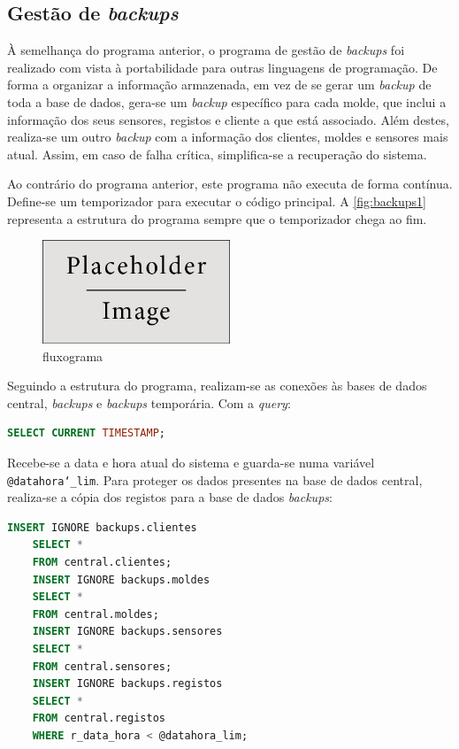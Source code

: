 \documentclass[11pt,twoside,a4paper]{report}
\begin{document}
\subsection{Gestão de \textit{backups}}
\label{subchap:backups}
À semelhança do programa anterior, o programa de gestão de \textit{backups} foi realizado com vista à portabilidade para outras linguagens de programação. De forma a organizar a informação armazenada, em vez de se gerar um \textit{backup} de toda a base de dados, gera-se um \textit{backup} específico para cada molde, que inclui a informação dos seus sensores, registos e cliente a que está associado. Além destes, realiza-se um outro \textit{backup} com a informação dos clientes, moldes e sensores mais atual. Assim, em caso de falha crítica, simplifica-se a recuperação do sistema.\par 
Ao contrário do programa anterior, este programa não executa de forma contínua. Define-se um temporizador para executar o código principal. A \autoref{fig:backups1} representa a estrutura do programa sempre que o temporizador chega ao fim.
\begin{figure}[H]
	\begin{center}
		\includegraphics[width=0.5\textwidth]{placeholder} %
		\caption{fluxograma}
		\label{fig:backups1}
	\end{center}
\end{figure}
Seguindo a estrutura do programa, realizam-se as conexões às bases de dados central, \textit{backups} e \textit{backups} temporária. Com a \textit{query}:
\begin{lstlisting}[language = SQL]
	SELECT CURRENT TIMESTAMP;
\end{lstlisting}
Recebe-se a data e hora atual do sistema e guarda-se numa variável \texttt{@datahora\char`_lim}. Para proteger os dados presentes na base de dados central, realiza-se a cópia dos registos para a base de dados \textit{backups}:
\begin{lstlisting}[language = SQL]
	INSERT IGNORE backups.clientes
	SELECT *
	FROM central.clientes;
	INSERT IGNORE backups.moldes
	SELECT *
	FROM central.moldes;
	INSERT IGNORE backups.sensores
	SELECT *
	FROM central.sensores;
	INSERT IGNORE backups.registos
	SELECT *
	FROM central.registos
	WHERE r_data_hora < @datahora_lim;
\end{lstlisting}
\end{document}
